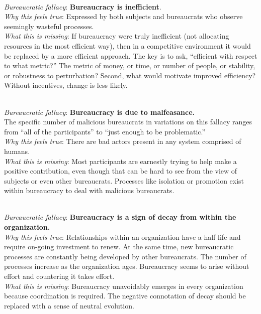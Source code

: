 \ \\
\textit{Bureaucratic fallacy}: \textbf{Bureaucracy is inefficient}. \\
\textit{Why this feels true}: Expressed by both subjects and bureaucrats who observe seemingly wasteful processes.\\
\textit{What this is missing}: If bureaucracy were truly inefficient (not allocating resources in the most efficient way), then in a competitive environment it would be replaced by a more efficient approach. The key is to ask, ``efficient with respect to what metric?'' The metric of money, or time, or number of people, or stability, or robustness to perturbation?  Second, what would motivate improved efficiency? Without incentives, change is less likely. 

\ \\
\textit{Bureaucratic fallacy}: \textbf{Bureaucracy is due to malfeasance.}\\
The specific number of malicious bureaucrats in variations on this fallacy ranges from ``all of the participants'' to ``just enough to be problematic.'' \\
\textit{Why this feels true}: There are bad actors present in any system comprised of humans. \\
\textit{What this is missing}: Most participants are earnestly trying to help make a positive contribution, even though that can be hard to see from the view of subjects or even other bureaucrats. Processes like isolation or promotion exist within bureaucracy to deal with malicious bureaucrats. 

\ \\
\textit{Bureaucratic fallacy}: \textbf{Bureaucracy is a sign of decay from within the organization.} \\
\textit{Why this feels true}: Relationships within an organization have a half-life and require on-going investment to renew. At the same time, new bureaucratic processes are constantly being developed by other bureaucrats. The number of processes increase as the organization ages. Bureaucracy seems to arise without effort and countering it takes effort.  \\
\textit{What this is missing}: Bureaucracy unavoidably emerges in every organization because coordination is required. The negative connotation of decay should be replaced with a sense of neutral evolution.

